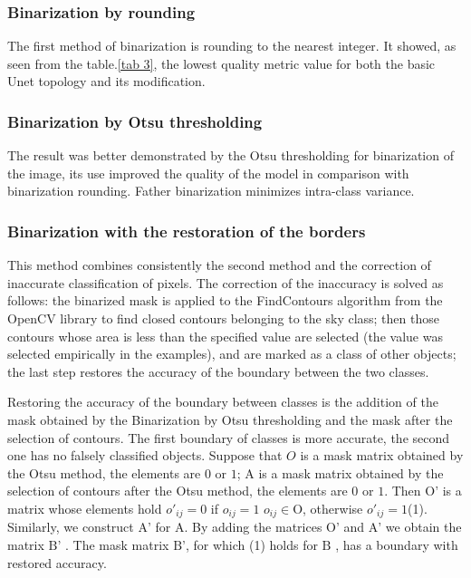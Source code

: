 \documentclass[runningheads]{llncs}
\begin{document}
\subsubsection{Binarization by rounding}
 The first method of binarization is rounding to the nearest integer. It showed, as seen from the table.\ref{tab 3}, the lowest quality metric value for both the basic Unet topology and its modification.

\subsubsection{Binarization by Otsu thresholding} 
The result was better demonstrated by the Otsu thresholding for binarization of the image, its use improved the quality of the model in comparison with binarization rounding. Father binarization minimizes intra-class variance.

\subsubsection{Binarization with the restoration of the borders} 
This method combines consistently the second method and the correction of inaccurate classification of pixels. The correction of the inaccuracy is solved as follows: the binarized mask is applied to the FindContours algorithm from the OpenCV library to find closed contours belonging to the sky class; then those contours whose area is less than the specified value are selected (the value was selected empirically in the examples), and are marked as a class of other objects; the last step restores the accuracy of the boundary between the two classes.

Restoring the accuracy of the boundary between classes is the addition of the mask obtained by the Binarization by Otsu thresholding and the mask after the selection of contours. The first boundary of classes is more accurate, the second one has no falsely classified objects. Suppose that $O$ is a mask matrix obtained by the Otsu method, the elements are $0$ or ${\text{1}}$; ${\text{A}}$ is a mask matrix obtained by the selection of contours after the Otsu method, the elements are ${\text{0}}$ or ${\text{1}}$. Then ${\text{O'}}$ is a matrix whose elements hold $ {o'_{ij} = 0}$ if ${o_{ij} = 1}$ ${o_{ij} \in \text{O}}$, otherwise ${o'_{ij} = 1}$(1). Similarly, we construct ${\text{A'}}$ for ${\text{A}}$. By adding the matrices ${\text{O'}}$ and ${\text{A'}}$ we obtain the matrix ${\text{B'}}$ . The mask matrix ${\text{B'}}$, for which (1) holds for ${\text{B}}$ , has a boundary with restored accuracy.
\end{document}
